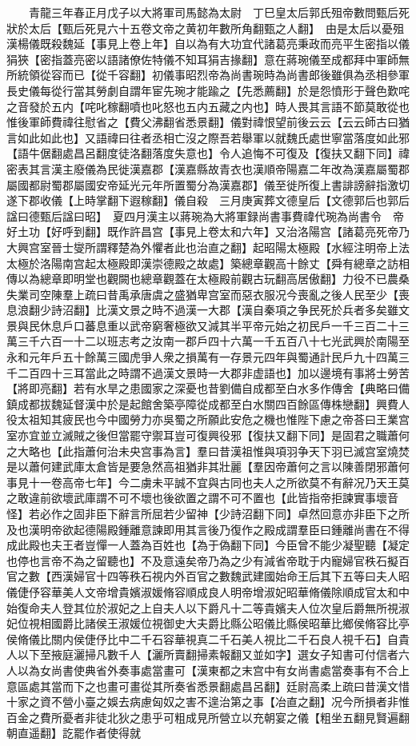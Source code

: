 　　青龍三年春正月戊子以大將軍司馬懿為太尉　丁巳皇太后郭氏殂帝數問甄后死狀於太后【甄后死見六十五卷文帝之黄初年數所角翻甄之人翻】　由是太后以憂殂　漢楊儀既殺魏延【事見上卷上年】自以為有大功宜代諸葛亮秉政而亮平生密指以儀狷狹【密指蓋亮密以語諸僚佐特儀不知耳狷吉掾翻】意在蔣琬儀至成都拜中軍師無所統領從容而已【從千容翻】初儀事昭烈帝為尚書琬時為尚書郎後雖俱為丞相參軍長史儀每從行當其勞劇自謂年宦先琬才能踰之【先悉薦翻】於是怨憤形于聲色歎咤之音發於五内【咤叱稼翻噴也叱怒也五内五藏之内也】時人畏其言語不節莫敢從也惟後軍師費禕往慰省之【費父沸翻省悉景翻】儀對禕恨望前後云云【云云師古曰猶言如此如此也】又語禕曰往者丞相亡沒之際吾若舉軍以就魏氏處世寧當落度如此邪【語牛倨翻處昌呂翻度徒洛翻落度失意也】令人追悔不可復及【復扶又翻下同】禕密表其言漢主廢儀為民徙漢嘉郡【漢嘉縣故青衣也漢順帝陽嘉二年改為漢嘉屬蜀郡屬國都尉蜀郡屬國安帝延光元年所置蜀分為漢嘉郡】儀至徙所復上書誹謗辭指激切遂下郡收儀【上時掌翻下遐稼翻】儀自殺　三月庚寅葬文德皇后【文德郭后也郭后諡曰德甄后諡曰昭】　夏四月漢主以蔣琬為大將軍録尚書事費禕代琬為尚書令　帝好土功【好呼到翻】既作許昌宫【事見上卷太和六年】又治洛陽宫【諸葛亮死帝乃大興宫室晉士燮所謂釋楚為外懼者此也治直之翻】起昭陽太極殿【水經注明帝上法太極於洛陽南宫起太極殿即漢崇德殿之故處】築總章觀高十餘丈【舜有總章之訪相傳以為總章即明堂也觀闕也總章觀蓋在太極殿前觀古玩翻高居傲翻】力役不已農桑失業司空陳羣上疏曰昔禹承唐虞之盛猶卑宫室而惡衣服况今喪亂之後人民至少【喪息浪翻少詩沼翻】比漢文景之時不過漢一大郡【漢自秦項之争民死於兵者多矣雖文景與民休息戶口蕃息重以武帝窮奢極欲又減其半平帝元始之初民戶一千三百二十三萬三千六百一十二以班志考之汝南一郡戶四十六萬一千五百八十七光武興於南陽至永和元年戶五十餘萬三國虎爭人衆之損萬有一存景元四年與蜀通計民戶九十四萬三千二百四十三耳當此之時謂不過漢文景時一大郡非虚語也】加以邊境有事將士勞苦【將即亮翻】若有水旱之患國家之深憂也昔劉備自成都至白水多作傳舍【典略曰備鎮成都拔魏延督漢中於是起館舍築亭障從成都至白水關四百餘區傳株戀翻】興費人役太祖知其疲民也今中國勞力亦吳蜀之所願此安危之機也惟陛下慮之帝荅曰王業宫室亦宜並立滅賊之後但當罷守禦耳豈可復興役邪【復扶又翻下同】是固君之職蕭何之大略也【此指蕭何治未央宫事為言】羣曰昔漢祖惟與項羽争天下羽已滅宫室燒焚是以蕭何建武庫太倉皆是要急然高祖猶非其壯麗【羣因帝蕭何之言以陳善閉邪蕭何事見十一卷高帝七年】今二虜未平誠不宜與古同也夫人之所欲莫不有辭况乃天王莫之敢違前欲壞武庫謂不可不壞也後欲置之謂不可不置也【此皆指帝拒諫實事壞音怪】若必作之固非臣下辭言所屈若少留神【少詩沼翻下同】卓然回意亦非臣下之所及也漢明帝欲起德陽殿鍾離意諫即用其言後乃復作之殿成謂羣臣曰鍾離尚書在不得成此殿也夫王者豈憚一人蓋為百姓也【為于偽翻下同】今臣曾不能少凝聖聽【凝定也停也言帝不為之留聽也】不及意遠矣帝乃為之少有減省帝耽于内寵婦官秩石擬百官之數【西漢婦官十四等秩石視内外百官之數魏武建國始命王后其下五等曰夫人昭儀倢伃容華美人文帝增貴嬪淑媛脩容順成良人明帝增淑妃昭華脩儀除順成官太和中始復命夫人登其位於淑妃之上自夫人以下爵凡十二等貴嬪夫人位次皇后爵無所視淑妃位視相國爵比諸侯王淑媛位視御史大夫爵比縣公昭儀比縣侯昭華比鄉侯脩容比亭侯脩儀比關内侯倢伃比中二千石容華視真二千石美人視比二千石良人視千石】自貴人以下至掖庭灑掃凡數千人【灑所賣翻掃素報翻又並如字】選女子知書可付信者六人以為女尚書使典省外奏事處當畫可【漢東都之末宫中有女尚書處當奏事有不合上意區處其當而下之也畫可畫從其所奏省悉景翻處昌呂翻】廷尉高柔上疏曰昔漢文惜十家之資不營小臺之娛去病慮匈奴之害不遑治第之事【冶直之翻】况今所損者非惟百金之費所憂者非徒北狄之患乎可粗成見所營立以充朝宴之儀【粗坐五翻見賢遍翻朝直遥翻】訖罷作者使得就